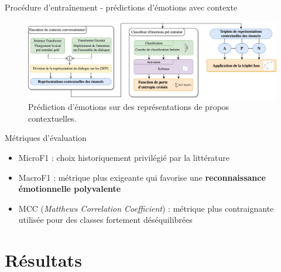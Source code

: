 \documentclass[11pt,aspectratio=169]{beamer}
\begin{document}
\begin{frame}{Procédure d'entraînement - prédictions d'émotions avec contexte}
    \begin{figure}
        \centering
        \includegraphics[width=\textwidth]{contextual_utterances_training_fr.png}
        \caption{\centering Prédiction d'émotions sur des représentations de propos contextuelles.}
    \end{figure}
\end{frame}

\begin{frame}{Métriques d'évaluation}
\begin{itemize}
    \item MicroF1 : choix historiquement privilégié par la littérature
    \item MacroF1 : métrique plus exigeante qui favorise une \textcolor{roose}{\bf reconnaissance émotionnelle polyvalente}
    \item MCC (\textsl{Matthews Correlation Coefficient}) : métrique plus contraignante utilisée pour des classes fortement déséquilibrées
\end{itemize}
\end{frame}

\section{Résultats}
\end{document}
